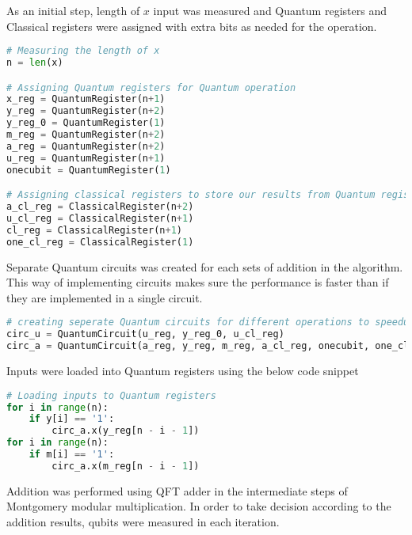 \documentclass{cpp}
\begin{document}
\newpage
As an initial step, length of $x$ input was measured and Quantum registers and Classical registers were assigned with extra bits as needed for the operation.

\begin{lstlisting}[language=Python]
# Measuring the length of x
n = len(x)

# Assigning Quantum registers for Quantum operation
x_reg = QuantumRegister(n+1)
y_reg = QuantumRegister(n+2)
y_reg_0 = QuantumRegister(1)
m_reg = QuantumRegister(n+2)
a_reg = QuantumRegister(n+2)
u_reg = QuantumRegister(n+1)
onecubit = QuantumRegister(1)

# Assigning classical registers to store our results from Quantum registers
a_cl_reg = ClassicalRegister(n+2)
u_cl_reg = ClassicalRegister(n+1)
cl_reg = ClassicalRegister(n+1)
one_cl_reg = ClassicalRegister(1)
\end{lstlisting}

Separate Quantum circuits was created for each sets of addition in the algorithm. This way of implementing circuits makes sure the performance is faster than if they are implemented in a single circuit. 

\newpage
\begin{lstlisting}[language=Python]
# creating seperate Quantum circuits for different operations to speedup the process
circ_u = QuantumCircuit(u_reg, y_reg_0, u_cl_reg)
circ_a = QuantumCircuit(a_reg, y_reg, m_reg, a_cl_reg, onecubit, one_cl_reg)
\end{lstlisting}

Inputs were loaded into Quantum registers using the below code snippet

\begin{lstlisting}[language=Python]
# Loading inputs to Quantum registers
for i in range(n):
    if y[i] == '1':
        circ_a.x(y_reg[n - i - 1])
for i in range(n):
    if m[i] == '1':
        circ_a.x(m_reg[n - i - 1])
\end{lstlisting}

Addition was performed using QFT adder in the intermediate steps of Montgomery modular multiplication. In order to take decision according to the addition results, qubits were measured in each iteration. 
\end{document}
